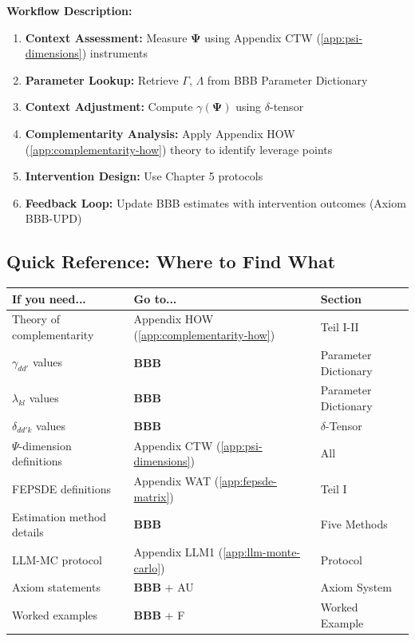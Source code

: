 \documentclass[11pt,a4paper]{article}
\theoremstyle{definition}
\begin{document}
\textbf{Workflow Description:}
\begin{enumerate}
    \item \textbf{Context Assessment:} Measure $\boldsymbol{\Psi}$ using Appendix CTW (\ref{app:psi-dimensions}) instruments
    \item \textbf{Parameter Lookup:} Retrieve $\Gamma$, $\Lambda$ from BBB Parameter Dictionary
    \item \textbf{Context Adjustment:} Compute $\gamma(\boldsymbol{\Psi})$ using $\delta$-tensor
    \item \textbf{Complementarity Analysis:} Apply Appendix HOW (\ref{app:complementarity-how}) theory to identify leverage points
    \item \textbf{Intervention Design:} Use Chapter 5 protocols
    \item \textbf{Feedback Loop:} Update BBB estimates with intervention outcomes (Axiom BBB-UPD)
\end{enumerate}

\subsection{Quick Reference: Where to Find What}

\begin{center}
\begin{tabular}{lll}
\toprule
\textbf{If you need...} & \textbf{Go to...} & \textbf{Section} \\
\midrule
Theory of complementarity & Appendix HOW (\ref{app:complementarity-how}) & Teil I-II \\
$\gamma_{dd'}$ values & \textbf{BBB} & Parameter Dictionary \\
$\lambda_{kl}$ values & \textbf{BBB} & Parameter Dictionary \\
$\delta_{dd'k}$ values & \textbf{BBB} & $\delta$-Tensor \\
$\Psi$-dimension definitions & Appendix CTW (\ref{app:psi-dimensions}) & All \\
FEPSDE definitions & Appendix WAT (\ref{app:fepsde-matrix}) & Teil I \\
Estimation method details & \textbf{BBB} & Five Methods \\
LLM-MC protocol & Appendix LLM1 (\ref{app:llm-monte-carlo}) & Protocol \\
Axiom statements & \textbf{BBB} + AU & Axiom System \\
Worked examples & \textbf{BBB} + F & Worked Example \\
\bottomrule
\end{tabular}
\end{center}
\end{document}
